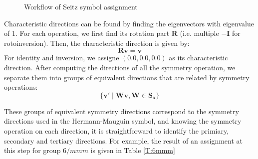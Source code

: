 \documentclass{article}
\begin{document}
\begin{figure}[h]
    \centering
    \caption{Workflow of Seitz symbol assignment}
    \label{F:workflow}
\end{figure}

Characteristic directions can be found by finding the eigenvectors with eigenvalue of $1$. For each operation,
we first find its rotation part $\mathbf{R}$ (i.e. multiple $-\mathbf{I}$ for rotoinversion). Then, the characteristic 
direction is given by:
\begin{equation}
    \label{E:eigendirection}
    \mathbf{R}\mathbf{v} = \mathbf{v}
\end{equation}
For identity and inversion, we assigne $(0.0, 0.0, 0.0)$ as its characteristic direction. 
After computing the directions of all the symmetry operation, we separate them into groups of equivalent directions 
that are related by symmetry operations:
\begin{equation}
    \{\mathbf{v}' \mid \mathbf{W}\mathbf{v}, \mathbf{W} \in \mathbf{S_\mathbf{x}}\}
\end{equation}

These groups of equivalent symmetry directions correspond to the symmetry directions used in the Hermann-Mauguin symbol,
and knowing the symmetry operation on each direction, it is straightforward to identify the primiary, 
secondary and tertiary directions. For example, the result of an assignment at this step for group $6/mmm$
is given in Table \ref{T:6mmm}
\end{document}
